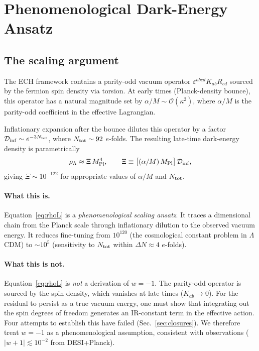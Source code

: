 \documentclass[aps,prd,twocolumn,superscriptaddress,showpacs,preprintnumbers,
  nofootinbib,longbibliography,floatfix]{revtex4-2}
\newcommand{\Dinf}{\mathcal{D}_{\rm inf}}
\newcommand{\MPl}{M_{\rm Pl}}
\begin{document}
\section{Phenomenological Dark-Energy Ansatz}\label{sec:ansatz}

\subsection{The scaling argument}\label{sec:scaling}

The ECH framework contains a parity-odd vacuum operator
$\varepsilon^{abcd}K_{ab}R_{cd}$ sourced by the fermion spin density via
torsion. At early times (Planck-density bounce), this operator has a
natural magnitude set by $\alpha/M \sim \mathcal{O}(\kappa^2)$, where
$\alpha/M$ is the parity-odd coefficient in the effective Lagrangian.

Inflationary expansion after the bounce dilutes this operator by a factor
$\Dinf \sim e^{-3N_{\rm tot}}$, where $N_{\rm tot} \sim 92$ $e$-folds.
The resulting late-time dark-energy density is parametrically
\begin{equation}\label{eq:rhoL}
  \rho_\Lambda \approx \Xi\,\MPl^4, \qquad
  \Xi \equiv \bigl[(\alpha/M)\,\MPl\bigr]\,\Dinf,
\end{equation}
giving $\Xi \sim 10^{-122}$ for appropriate values of $\alpha/M$ and
$N_{\rm tot}$.

\paragraph{What this is.}
Equation~\eqref{eq:rhoL} is a \textit{phenomenological scaling ansatz}.
It traces a dimensional chain from the Planck scale through inflationary
dilution to the observed vacuum energy. It reduces fine-tuning from
$10^{120}$ (the cosmological constant problem in $\Lambda$CDM) to
$\sim\!10^5$ (sensitivity to $N_{\rm tot}$ within $\Delta N \approx 4$
$e$-folds).

\paragraph{What this is not.}
Equation~\eqref{eq:rhoL} is \textit{not} a derivation of $w = -1$.
The parity-odd operator is sourced by the spin density, which vanishes
at late times ($K_{ab} \to 0$). For the residual to persist as a true
vacuum energy, one must show that integrating out the spin degrees of
freedom generates an IR-constant term in the effective action. Four
attempts to establish this have failed (Sec.~\ref{sec:closures}). We
therefore treat $w = -1$ as a phenomenological assumption, consistent
with observations ($|w+1| \lesssim 10^{-2}$ from DESI+Planck).
\end{document}
